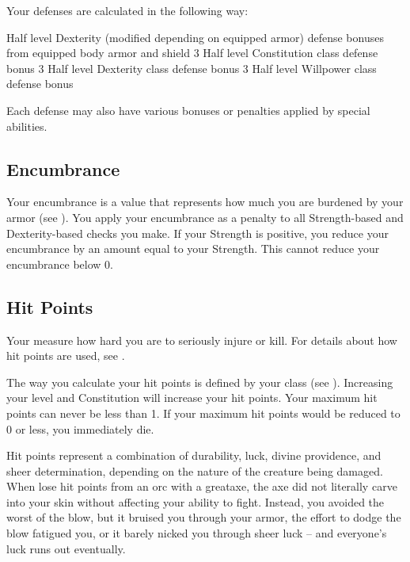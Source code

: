     Your defenses are calculated in the following way:
    \begin{itemize}
       Half level \add Dexterity (modified depending on equipped armor) \add defense bonuses from equipped body armor and shield
       3 \add Half level \add Constitution \add class defense bonus
       3 \add Half level \add Dexterity \add class defense bonus
       3 \add Half level \add Willpower \add class defense bonus
    \end{itemize}
    Each defense may also have various bonuses or penalties applied by special abilities.

  \subsection{Encumbrance}\label{Encumbrance}
    Your encumbrance is a value that represents how much you are burdened by your armor (see ).
    You apply your encumbrance as a penalty to all Strength-based and Dexterity-based checks you make.
    If your Strength is positive, you reduce your encumbrance by an amount equal to your Strength.
    This cannot reduce your encumbrance below 0.

  \subsection{Hit Points}\label{Hit Points}
    Your  measure how hard you are to seriously injure or kill.
    For details about how hit points are used, see .

    The way you calculate your hit points is defined by your class (see ).
    Increasing your level and Constitution will increase your hit points.
    Your maximum hit points can never be less than 1.
    If your maximum hit points would be reduced to 0 or less, you immediately die.

     Hit points represent a combination of durability, luck, divine providence, and sheer determination, depending on the nature of the creature being damaged.
    When lose hit points from an orc with a greataxe, the axe did not literally carve into your skin without affecting your ability to fight.
    Instead, you avoided the worst of the blow, but it bruised you through your armor, the effort to dodge the blow fatigued you, or it barely nicked you through sheer luck -- and everyone's luck runs out eventually.

